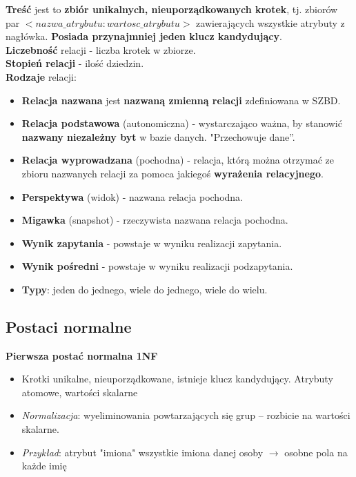 \documentclass[main.tex]{subfiles}
\begin{document}
    \textbf{Treść} jest to \textbf{zbiór unikalnych, nieuporządkowanych krotek}, tj. zbiorów par
    $<nazwa\_atrybutu : wartosc\_atrybutu>$ zawierających wszystkie atrybuty z nagłówka.
    \textbf{Posiada przynajmniej jeden klucz kandydujący}.\\

    \noindent \textbf{Liczebność} relacji - liczba krotek w zbiorze.\\
    \noindent \textbf{Stopień relacji} - ilość dziedzin.\\

    \noindent \textbf{Rodzaje} relacji:
    \begin{itemize}[noitemsep]
        \item \textbf{Relacja nazwana} jest \textbf{nazwaną zmienną relacji} zdefiniowana w SZBD.
        \item \textbf{Relacja podstawowa} (autonomiczna) - wystarczająco ważna, by stanowić \textbf{nazwany niezależny byt} w bazie danych. "Przechowuje dane”.
        \item \textbf{Relacja wyprowadzana} (pochodna) - relacja, którą można otrzymać ze zbioru nazwanych relacji za pomoca jakiegoś \textbf{wyrażenia relacyjnego}.
        \item \textbf{Perspektywa} (widok) - nazwana relacja pochodna.
        \item \textbf{Migawka} (snapshot) - rzeczywista nazwana relacja pochodna.
        \item \textbf{Wynik zapytania} - powstaje w wyniku realizacji zapytania.
        \item \textbf{Wynik pośredni} - powstaje w wyniku realizacji podzapytania.
        \item \textbf{Typy}: jeden do jednego, wiele do jednego, wiele do wielu.
    \end{itemize}

    \subsection{Postaci normalne}

    \textbf{Pierwsza postać normalna 1NF}
    \begin{itemize}[noitemsep]
        \item Krotki unikalne, nieuporządkowane, istnieje klucz kandydujący. Atrybuty atomowe, wartości skalarne
        \item \textit{Normalizacja}: wyeliminowania powtarzających się grup -- rozbicie na wartości skalarne.
        \item \textit{Przykład}: atrybut "imiona" wszystkie imiona danej osoby $\rightarrow$ osobne pola na każde imię
    \end{itemize}
\end{document}
